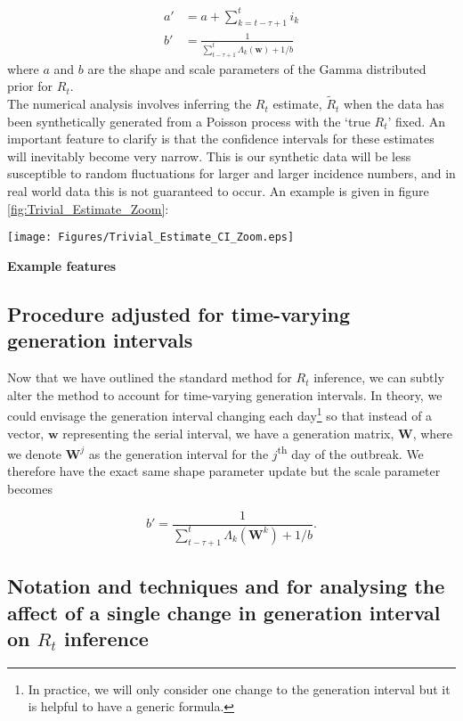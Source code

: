 \documentclass[10pt,journal,compsoc]{IEEEtran}
\newcommand{\ts}{\textsuperscript}
\begin{document}
\begin{align*}
    a' &= a+\sum_{k=t-\tau+1}^t i_k\\
    b' &= \frac{1}{\sum_{t-\tau+1}^t \Lambda_k(\boldsymbol{w})+1/b}
\end{align*}
where $a$ and $b$ are the shape and scale parameters of the $\mathrm{Gamma}$ distributed prior for $R_t$.\\

The numerical analysis involves inferring the $R_t$ estimate, $\tilde{R}_t$ when the data has been synthetically generated from a Poisson process with the `true $R_t$' fixed. An important feature to clarify is that the confidence intervals for these estimates will inevitably become very narrow. This is our synthetic data will be less susceptible to random fluctuations for larger and larger incidence numbers, and in real world data this is not guaranteed to occur. An example is given in figure \ref{fig:Trivial_Estimate_Zoom}:

\begin{minipage}{0.95\linewidth}
\centering
\texttt{[image: Figures/Trivial\_Estimate\_CI\_Zoom.eps]}
\label{fig:Trivial_Estimate_Zoom}
\end{minipage}  

\textbf{Example features}
\subsection{Procedure adjusted for time-varying generation intervals}\label{sect:Update_method}

Now that we have outlined the standard method for $R_t$ inference, we can subtly alter the method to account for time-varying generation intervals. In theory, we could envisage the generation interval changing each day\footnote{In practice, we will only consider one change to the generation interval but it is helpful to have a generic formula.} so that instead of a vector, $\boldsymbol{w}$ representing the serial interval, we have a generation matrix, $\boldsymbol{W}$, where we denote $\boldsymbol{W}^j$ as the generation interval for the $j$\ts{th} day of the outbreak. We therefore have the exact same shape parameter update but the scale parameter becomes

$$ b' = \frac{1}{\sum_{t-\tau+1}^t \Lambda_k(\boldsymbol{W}^k)+1/b}.$$

\subsection{Notation and techniques and for analysing the affect of a single change in generation interval on $R_t$ inference}\label{sect:Method_Analysis}
\end{document}
